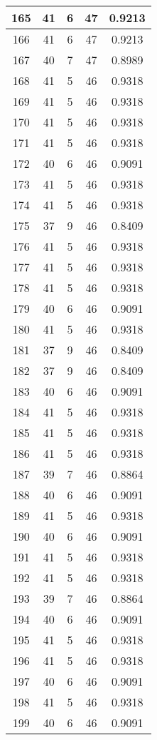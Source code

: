 \documentclass[letterpaper, 12pt]{article}
\begin{document}
\begin{longtable}{|c|c|c|c|c|}
\hline
165 & 41 & 6 & 47 & 0.9213 \\
\hline
166 & 41 & 6 & 47 & 0.9213 \\
\hline
167 & 40 & 7 & 47 & 0.8989 \\
\hline
168 & 41 & 5 & 46 & 0.9318 \\
\hline
169 & 41 & 5 & 46 & 0.9318 \\
\hline
170 & 41 & 5 & 46 & 0.9318 \\
\hline
171 & 41 & 5 & 46 & 0.9318 \\
\hline
172 & 40 & 6 & 46 & 0.9091 \\
\hline
173 & 41 & 5 & 46 & 0.9318 \\
\hline
174 & 41 & 5 & 46 & 0.9318 \\
\hline
175 & 37 & 9 & 46 & 0.8409 \\
\hline
176 & 41 & 5 & 46 & 0.9318 \\
\hline
177 & 41 & 5 & 46 & 0.9318 \\
\hline
178 & 41 & 5 & 46 & 0.9318 \\
\hline
179 & 40 & 6 & 46 & 0.9091 \\
\hline
180 & 41 & 5 & 46 & 0.9318 \\
\hline
181 & 37 & 9 & 46 & 0.8409 \\
\hline
182 & 37 & 9 & 46 & 0.8409 \\
\hline
183 & 40 & 6 & 46 & 0.9091 \\
\hline
184 & 41 & 5 & 46 & 0.9318 \\
\hline
185 & 41 & 5 & 46 & 0.9318 \\
\hline
186 & 41 & 5 & 46 & 0.9318 \\
\hline
187 & 39 & 7 & 46 & 0.8864 \\
\hline
188 & 40 & 6 & 46 & 0.9091 \\
\hline
189 & 41 & 5 & 46 & 0.9318 \\
\hline
190 & 40 & 6 & 46 & 0.9091 \\
\hline
191 & 41 & 5 & 46 & 0.9318 \\
\hline
192 & 41 & 5 & 46 & 0.9318 \\
\hline
193 & 39 & 7 & 46 & 0.8864 \\
\hline
194 & 40 & 6 & 46 & 0.9091 \\
\hline
195 & 41 & 5 & 46 & 0.9318 \\
\hline
196 & 41 & 5 & 46 & 0.9318 \\
\hline
197 & 40 & 6 & 46 & 0.9091 \\
\hline
198 & 41 & 5 & 46 & 0.9318 \\
\hline
199 & 40 & 6 & 46 & 0.9091 \\
\hline
\end{longtable}
\end{document}
